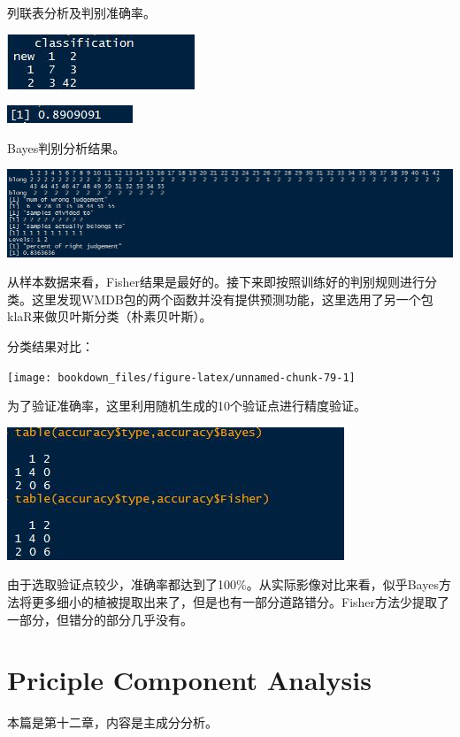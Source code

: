 \documentclass[]{ctexbook}
\begin{document}
列联表分析及判别准确率。

\includegraphics[width=0.4\linewidth,height=0.1\textheight]{fig/fig31}

\includegraphics[width=0.6\linewidth,height=0.02\textheight]{fig/fig32}

Bayes判别分析结果。

\includegraphics[width=1\linewidth,height=0.2\textheight]{fig/fig33}

从样本数据来看，Fisher结果是最好的。接下来即按照训练好的判别规则进行分类。这里发现WMDB包的两个函数并没有提供预测功能，这里选用了另一个包klaR来做贝叶斯分类（朴素贝叶斯）。

分类结果对比：

\texttt{[image: bookdown\_files/figure-latex/unnamed-chunk-79-1]}

为了验证准确率，这里利用随机生成的10个验证点进行精度验证。

\includegraphics[width=0.6\linewidth,height=0.2\textheight]{fig/fig34}

由于选取验证点较少，准确率都达到了100\%。从实际影像对比来看，似乎Bayes方法将更多细小的植被提取出来了，但是也有一部分道路错分。Fisher方法少提取了一部分，但错分的部分几乎没有。

\hypertarget{pca}{%
\chapter{Priciple Component Analysis}\label{pca}}

本篇是第十二章，内容是主成分分析。
\end{document}

